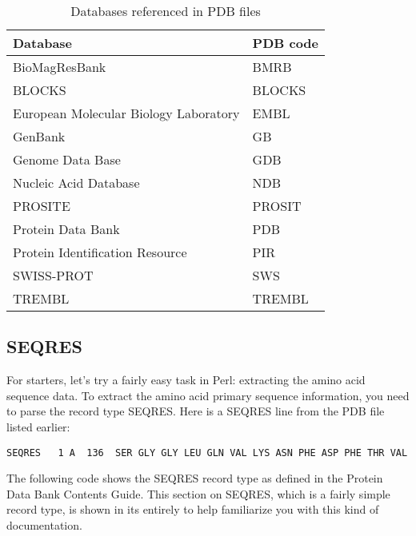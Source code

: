 \begin{table}[!htbp]
  \begin{center}
  \caption{Databases referenced in PDB files}
  \label{tab:table11.1}
  \begin{tabu} to 0.6\linewidth {X[3,l,m]X[1,l,m]}
  \toprule
  Database & PDB code\\
  \midrule
  BioMagResBank & BMRB \\
  BLOCKS & BLOCKS\\
  European Molecular Biology Laboratory & EMBL\\
  GenBank & GB\\
  Genome Data Base & GDB\\
  Nucleic Acid Database & NDB\\
  PROSITE & PROSIT\\
  Protein Data Bank & PDB\\
  Protein Identification Resource & PIR\\
  SWISS-PROT & SWS\\
  TREMBL & TREMBL\\
  \bottomrule
  \end{tabu}
  \end{center}
\end{table}

\subsection{SEQRES}
For starters, let's try a fairly easy task in Perl: extracting the amino acid sequence data. To extract the amino acid primary sequence information, you need to parse the record type SEQRES. Here is a SEQRES line from the PDB file listed earlier: 

\begin{lstlisting}
SEQRES   1 A  136  SER GLY GLY LEU GLN VAL LYS ASN PHE ASP PHE THR VAL
\end{lstlisting}

The following code shows the SEQRES record type as defined in the Protein Data Bank Contents Guide. This section on SEQRES, which is a fairly simple record type, is shown in its entirely to help familiarize you with this kind of documentation. 

